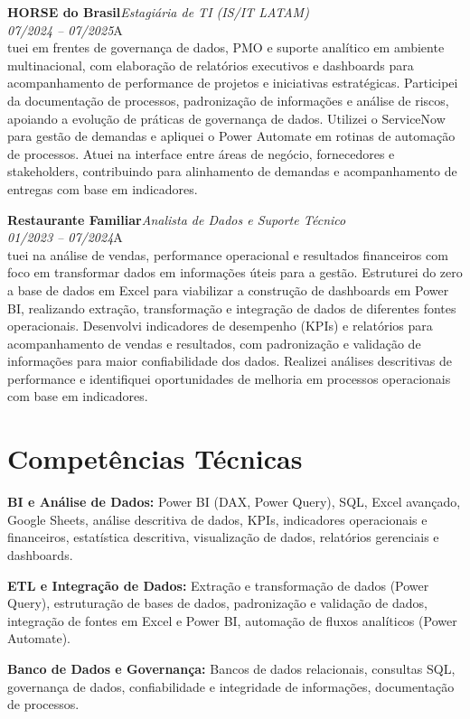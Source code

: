 \documentclass[11pt,a4paper]{article}
\newcommand{\cvrole}[4]{%
  \vspace{4pt}%
  {\bfseries\color{accentcolor}#1}\hfill{\itshape #2}\\[-2pt]%
  {\itshape #3}\hfill #4\\[6pt]%
}
\begin{document}
\cvrole{HORSE do Brasil}{Estagiária de TI (IS/IT LATAM)}{07/2024 -- 07/2025}

Atuei em frentes de governança de dados, PMO e suporte analítico em ambiente multinacional, com elaboração de relatórios executivos e dashboards para acompanhamento de performance de projetos e iniciativas estratégicas. Participei da documentação de processos, padronização de informações e análise de riscos, apoiando a evolução de práticas de governança de dados. Utilizei o ServiceNow para gestão de demandas e apliquei o Power Automate em rotinas de automação de processos. Atuei na interface entre áreas de negócio, fornecedores e stakeholders, contribuindo para alinhamento de demandas e acompanhamento de entregas com base em indicadores.

\cvrole{Restaurante Familiar}{Analista de Dados e Suporte Técnico}{01/2023 -- 07/2024}

Atuei na análise de vendas, performance operacional e resultados financeiros com foco em transformar dados em informações úteis para a gestão. Estruturei do zero a base de dados em Excel para viabilizar a construção de dashboards em Power BI, realizando extração, transformação e integração de dados de diferentes fontes operacionais. Desenvolvi indicadores de desempenho (KPIs) e relatórios para acompanhamento de vendas e resultados, com padronização e validação de informações para maior confiabilidade dos dados. Realizei análises descritivas de performance e identifiquei oportunidades de melhoria em processos operacionais com base em indicadores.

\section{Competências Técnicas}

\textbf{BI e Análise de Dados:} Power BI (DAX, Power Query), SQL, Excel avançado, Google Sheets, análise descritiva de dados, KPIs, indicadores operacionais e financeiros, estatística descritiva, visualização de dados, relatórios gerenciais e dashboards.

\textbf{ETL e Integração de Dados:} Extração e transformação de dados (Power Query), estruturação de bases de dados, padronização e validação de dados, integração de fontes em Excel e Power BI, automação de fluxos analíticos (Power Automate).

\textbf{Banco de Dados e Governança:} Bancos de dados relacionais, consultas SQL, governança de dados, confiabilidade e integridade de informações, documentação de processos.
\end{document}
